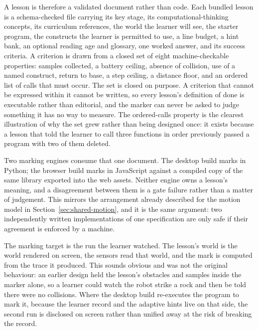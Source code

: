 \documentclass[11pt,a4paper]{report}
\begin{document}
A lesson is therefore a validated document rather than code. Each bundled lesson is a schema-checked file carrying its key stage, its computational-thinking concepts, its curriculum references, the world the learner will see, the starter program, the constructs the learner is permitted to use, a line budget, a hint bank, an optional reading age and glossary, one worked answer, and its success criteria. A criterion is drawn from a closed set of eight machine-checkable properties: samples collected, a battery ceiling, absence of collision, use of a named construct, return to base, a step ceiling, a distance floor, and an ordered list of calls that must occur. The set is closed on purpose. A criterion that cannot be expressed within it cannot be written, so every lesson's definition of done is executable rather than editorial, and the marker can never be asked to judge something it has no way to measure. The ordered-calls property is the clearest illustration of why the set grew rather than being designed once: it exists because a lesson that told the learner to call three functions in order previously passed a program with two of them deleted.

Two marking engines consume that one document. The desktop build marks in Python; the browser build marks in JavaScript against a compiled copy of the same library exported into the web assets. Neither engine owns a lesson's meaning, and a disagreement between them is a gate failure rather than a matter of judgement. This mirrors the arrangement already described for the motion model in Section~\ref{sec:shared-motion}, and it is the same argument: two independently written implementations of one specification are only safe if their agreement is enforced by a machine.

The marking target is the run the learner watched. The lesson's world is the world rendered on screen, the sensors read that world, and the mark is computed from the trace it produced. This sounds obvious and was not the original behaviour: an earlier design held the lesson's obstacles and samples inside the marker alone, so a learner could watch the robot strike a rock and then be told there were no collisions. Where the desktop build re-executes the program to mark it, because the learner record and the adaptive hints live on that side, the second run is disclosed on screen rather than unified away at the risk of breaking the record.
\end{document}
